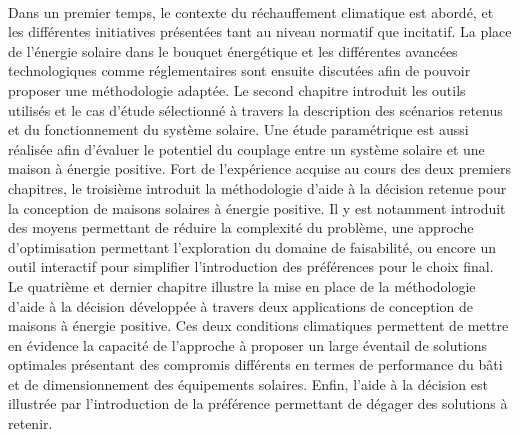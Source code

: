 \paragraph{} %
Dans un premier temps, le contexte du réchauffement climatique est abordé, et les
différentes initiatives présentées tant au niveau normatif que incitatif. La place de
l’énergie solaire dans le bouquet énergétique et les différentes avancées technologiques
comme réglementaires sont ensuite discutées afin de pouvoir proposer une méthodologie
adaptée. Le second chapitre introduit les outils utilisés et le cas d’étude sélectionné à
travers la description des scénarios retenus et du fonctionnement du système solaire. Une
étude paramétrique est aussi réalisée afin d’évaluer le potentiel du couplage entre un
système solaire et une maison à énergie positive. Fort de l’expérience acquise au cours
des deux premiers chapitres, le troisième introduit la méthodologie d’aide à la décision
retenue pour la conception de maisons solaires à énergie positive. Il y est notamment
introduit des moyens permettant de réduire la complexité du problème, une approche
d’optimisation permettant l’exploration du domaine de faisabilité, ou encore un outil
interactif pour simplifier l’introduction des préférences pour le choix final. Le
quatrième et dernier chapitre illustre la mise en place de la méthodologie d’aide à la
décision développée à travers deux applications de conception de maisons à énergie
positive. Ces deux conditions climatiques permettent de mettre en évidence la capacité de
l’approche à proposer un large éventail de solutions optimales présentant des compromis
différents en termes de performance du bâti et de dimensionnement des équipements
solaires. Enfin, l’aide à la décision est illustrée par l’introduction de la préférence
permettant de dégager des solutions à retenir.
